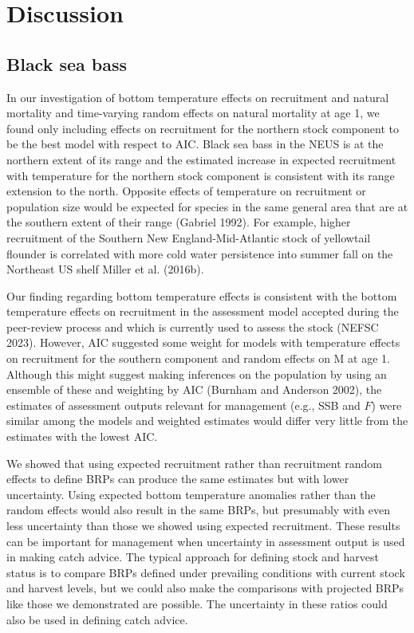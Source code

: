 \documentclass[
]{article}
\begin{document}
\hypertarget{discussion}{%
\section*{Discussion}\label{discussion}}

\hypertarget{black-sea-bass}{%
\subsection*{Black sea bass}\label{black-sea-bass}}

In our investigation of bottom temperature effects on recruitment and
natural mortality and time-varying random effects on natural mortality
at age 1, we found only including effects on recruitment for the
northern stock component to be the best model with respect to AIC. Black
sea bass in the NEUS is at the northern extent of its range and the
estimated increase in expected recruitment with temperature for the
northern stock component is consistent with its range extension to the
north. Opposite effects of temperature on recruitment or population size
would be expected for species in the same general area that are at the
southern extent of their range (Gabriel 1992). For example, higher
recruitment of the Southern New England-Mid-Atlantic stock of yellowtail
flounder is correlated with more cold water persistence into summer fall
on the Northeast US shelf Miller et al. (2016b).

Our finding regarding bottom temperature effects is consistent with the
bottom temperature effects on recruitment in the assessment model
accepted during the peer-review process and which is currently used to
assess the stock (NEFSC 2023). However, AIC suggested some weight for
models with temperature effects on recruitment for the southern
component and random effects on M at age 1. Although this might suggest
making inferences on the population by using an ensemble of these and
weighting by AIC (Burnham and Anderson 2002), the estimates of
assessment outputs relevant for management (e.g., SSB and \(F\)) were
similar among the models and weighted estimates would differ very little
from the estimates with the lowest AIC.

We showed that using expected recruitment rather than recruitment random
effects to define BRPs can produce the same estimates but with lower
uncertainty. Using expected bottom temperature anomalies rather than the
random effects would also result in the same BRPs, but presumably with
even less uncertainty than those we showed using expected recruitment.
These results can be important for management when uncertainty in
assessment output is used in making catch advice. The typical approach
for defining stock and harvest status is to compare BRPs defined under
prevailing conditions with current stock and harvest levels, but we
could also make the comparisons with projected BRPs like those we
demonstrated are possible. The uncertainty in these ratios could also be
used in defining catch advice.
\end{document}
